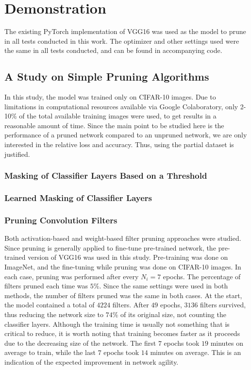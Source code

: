 \documentclass{article}
\begin{document}
\section{Demonstration}

The existing PyTorch implementation of VGG16 was used as the model to prune in all tests conducted in this work. The optimizer and other settings used were the same in all tests conducted, and can be found in accompanying code.

\subsection{A Study on Simple Pruning Algorithms}

In this study, the model was trained only on CIFAR-10 images. Due to limitations in computational resources available via Google Colaboratory, only 2-10\% of the total available training images were used, to get results in a reasonable amount of time. Since the main point to be studied here is the performance of a pruned network compared to an unpruned network, we are only interested in the relative loss and accuracy. Thus, using the partial dataset is justified.

\subsubsection{Masking of Classifier Layers Based on a Threshold}

\subsubsection{Learned Masking of Classifier Layers}

\subsubsection{Pruning Convolution Filters} \label{PruneFilterRes}

Both activation-based and weight-based filter pruning approaches were studied. Since pruning is generally applied to fine-tune pre-trained network, the pre-trained version of VGG16 was used in this study. Pre-training was done on ImageNet, and the fine-tuning while pruning was done on CIFAR-10 images. In each case, pruning was performed after every $N_i = 7$ epochs. The percentage of filters pruned each time was $5$\%. Since the same settings were used in both methods, the number of filters pruned was the same in both cases. At the start, the model contained a total of $4224$ filters. After $49$ epochs, $3136$ filters survived, thus reducing the network size to $74$\% of its original size, not counting the classifier layers. Although the training time is usually not something that is critical to reduce, it is worth noting that training becomes faster as it proceeds due to the decreasing size of the network. The first $7$ epochs took $19$ minutes on average to train, while the last $7$ epochs took $14$ minutes on average. This is an indication of the expected improvement in network agility.
\end{document}
